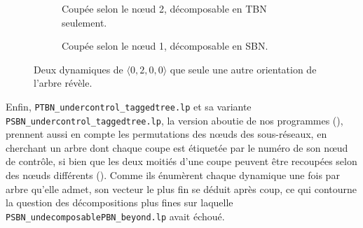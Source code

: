 \documentclass[12pt, a4paper]{article}
\begin{document}
\begin{figure}[H]
    \centering
    \begin{subfigure}{0.48\linewidth}
        \centering
        \caption{Coupée selon le nœud 2, décomposable en TBN seulement.}
    \end{subfigure}
    \hfill
    \begin{subfigure}{0.48\linewidth}
        \centering
        \caption{Coupée selon le nœud 1, décomposable en SBN.}
    \end{subfigure}
    \caption{Deux dynamiques de $\langle 0,2,0,0\rangle$ que seule une autre orientation de l'arbre révèle.}
    \label{fig:treeinsolver}
\end{figure}

Enfin, \texttt{PTBN\_undercontrol\_taggedtree.lp} et sa variante \texttt{PSBN\_undercontrol\_taggedtree.lp}, la version aboutie de nos programmes (), prennent aussi en compte les permutations des nœuds des sous-réseaux, en cherchant un arbre dont chaque coupe est étiquetée par le numéro de son nœud de contrôle, si bien que les deux moitiés d'une coupe peuvent être recoupées selon des nœuds différents ().
Comme ils énumèrent chaque dynamique une fois par arbre qu'elle admet, son vecteur le plus fin se déduit après coup, ce qui contourne la question des décompositions plus fines sur laquelle \texttt{PSBN\_undecomposablePBN\_beyond.lp} avait échoué.
\end{document}
